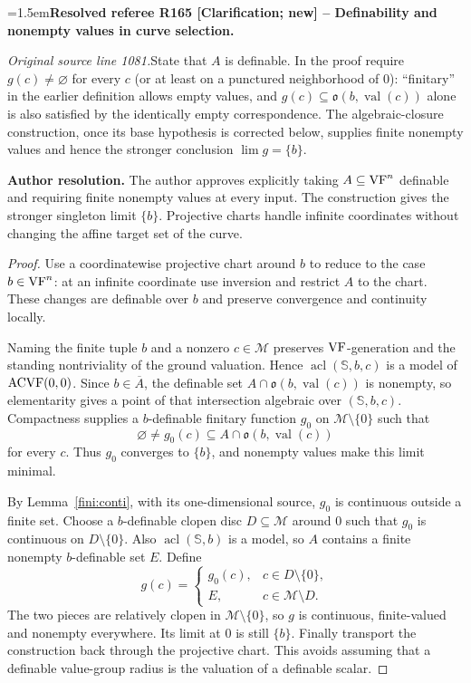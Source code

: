 \documentclass[12pt]{amsart}
\newcommand{\ResolvedRefereeRemark}[5]{%
  \par\medskip\begingroup\normalfont\small\color{gray}%
  \emergencystretch=1.5em\noindent\textbf{Resolved referee R#1 [#2] -- #3.}\par\nobreak\noindent #4\par
  \medskip\color{ResolutionGreen}\noindent\textbf{Author resolution.} #5\par
  \endgroup\medskip
}
\theoremstyle{plain}
\theoremstyle{definition}
\theoremstyle{remark}
\numberwithin{equation}{section}
\theoremstyle{plain}
\newcommand{\VF}{\textup{VF}}
\newcommand{\ACVF}{\textup{ACVF}}
\newcommand{\MM}{\mdl M}
\DeclareMathOperator{\acl}{acl}
\newcommand{\go}{\mathfrak{o}}
\newcommand{\0}{\emptyset}
\newcommand{\mdl}[1]{\mathcal{#1}}  %
\newcommand{\sub}{\subseteq}
\DeclareMathOperator{\vv}{val}
\begin{document}
\ResolvedRefereeRemark{165}{Clarification; new}{Definability and nonempty values in curve selection}{%
\textit{Original source line 1081.}\quad State that $A$ is definable. In the proof require $g(c)\ne\varnothing$ for every $c$ (or at least on a punctured neighborhood of $0$): ``finitary'' in the earlier definition allows empty values, and $g(c)\subseteq\go(b,\vv(c))$ alone is also satisfied by the identically empty correspondence. The algebraic-closure construction, once its base hypothesis is corrected below, supplies finite nonempty values and hence the stronger conclusion $\lim g=\{b\}$.
}{The author approves explicitly taking $A\subseteq\VF^n$ definable and requiring finite nonempty values at every input. The construction gives the stronger singleton limit $\{b\}$. Projective charts handle infinite coordinates without changing the affine target set of the curve.}
\begin{proof}
Use a coordinatewise projective chart around $b$ to reduce to the case $b\in\VF^n$: at an infinite coordinate use inversion and restrict $A$ to the chart. These changes are definable over $b$ and preserve convergence and continuity locally.

Naming the finite tuple $b$ and a nonzero $c\in\MM$ preserves $\VF$-generation and the standing nontriviality of the ground valuation. Hence $\acl(\mathbb S,b,c)$ is a model of $\ACVF(0,0)$. Since $b\in\overline A$, the definable set $A\cap\go(b,\vv(c))$ is nonempty, so elementarity gives a point of that intersection algebraic over $(\mathbb S,b,c)$. Compactness supplies a $b$-definable finitary function $g_0$ on $\MM\setminus\{0\}$ such that
\[
\varnothing\ne g_0(c)\sub A\cap\go(b,\vv(c))
\]
for every $c$. Thus $g_0$ converges to $\{b\}$, and nonempty values make this limit minimal.

By Lemma~\ref{fini:conti}, with its one-dimensional source, $g_0$ is continuous outside a finite set. Choose a $b$-definable clopen disc $D\sub\MM$ around $0$ such that $g_0$ is continuous on $D\setminus\{0\}$. Also $\acl(\mathbb S,b)$ is a model, so $A$ contains a finite nonempty $b$-definable set $E$. Define
\[
g(c)=\begin{cases}
g_0(c),&c\in D\setminus\{0\},\\
E,&c\in\MM\setminus D.
\end{cases}
\]
The two pieces are relatively clopen in $\MM\setminus\{0\}$, so $g$ is continuous, finite-valued and nonempty everywhere. Its limit at $0$ is still $\{b\}$. Finally transport the construction back through the projective chart. This avoids assuming that a definable value-group radius is the valuation of a definable scalar.
\end{proof}
\end{document}
